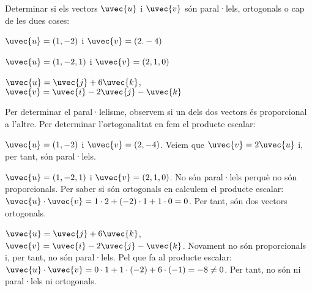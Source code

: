 \Exercise Determinar si els vectors $\uvec{u}$ i $\uvec{v}$ són paral·lels, ortogonals o cap de les dues coses:

\begin{llista}
  \item $\uvec{u}=(1,-2)$ i $\uvec{v}=(2.-4)$
  \item $\uvec{u}=(1,-2,1)$ i $\uvec{v}=(2,1,0)$
  \item $\uvec{u}=\uvec{j}+6\uvec{k}$, $\uvec{v}=\uvec{i}-2\uvec{j}-\uvec{k}$
\end{llista}

\Answer Per determinar el paral·lelisme, observem si un dels dos vectors és proporcional a l'altre. Per determinar l'ortogonalitat en fem el producte escalar:

\begin{llista}
  \item $\uvec{u}=(1,-2)$ i $\uvec{v}=(2,-4)$. Veiem que $\uvec{v}=2\uvec{u}$ i, per tant, són paral·lels.
  \item $\uvec{u}=(1,-2,1)$ i $\uvec{v}=(2,1,0)$. No són paral·lels perquè no són proporcionals. Per saber si són ortogonals en calculem el producte escalar: $\uvec{u}\cdot\uvec{v}=1\cdot2+(-2)\cdot1+1\cdot0=0$. Per tant, són dos vectors ortogonals.
  \item $\uvec{u}=\uvec{j}+6\uvec{k}$, $\uvec{v}=\uvec{i}-2\uvec{j}-\uvec{k}$. Novament no són proporcionals i, per tant, no són paral·lels. Pel que fa al producte escalar: $\uvec{u}\cdot\uvec{v}=0\cdot1+1\cdot(-2)+6\cdot(-1)=-8\neq0$. Per tant, no són ni paral·lels ni ortogonals.
\end{llista}
\blacksquare
